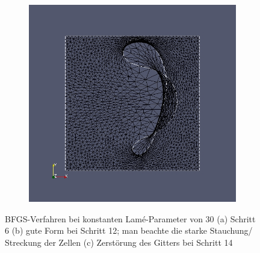 \begin{figure}
\begin{subfigure}{0.315\textwidth}
	\caption{}	
	\end{subfigure}
	\begin{subfigure}{0.315\textwidth}
	\centering
	\includegraphics[scale=0.21]{pic_brokendonut_bfgs_konstlame_14.jpg}
	\caption{}	
	\end{subfigure}
\caption{BFGS-Verfahren bei konstanten Lamé-Parameter von 30 (a) Schritt 6 (b) gute Form bei Schritt 12; man beachte die starke Stauchung/ Streckung der Zellen (c) Zerstörung des Gitters bei Schritt 14}
\label{brokendonut_bfgs_konstlame}
\end{figure}

